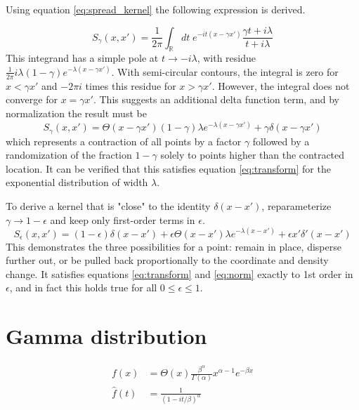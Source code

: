 \documentclass{article}
\newcommand{\intR}{\int_{\mathbb{R}}}
\begin{document}
Using equation \ref{eq:spread_kernel} the following expression is derived.

\begin{equation}
	S_\gamma (x, x') =\frac{1}{2\pi} \intR dt\;e^{-it(x - \gamma x')} \frac{\gamma t + i\lambda}{t + i\lambda}
\end{equation}
This integrand has a simple pole at $t \rightarrow -i\lambda$, with residue
$\frac{1}{2\pi} i \lambda (1-\gamma) e^{-\lambda(x - \gamma x')}$. With
semi-circular contours, the integral is zero for $x < \gamma x'$ and $-2\pi i$
times this residue for $ x > \gamma x'$. However, the integral does not
converge for $x = \gamma x'$. This suggests an additional delta function term,
and by normalization the result must be
\begin{equation}
	S_\gamma(x, x')  = \Theta(x - \gamma x') (1 - \gamma) \lambda e^{-\lambda (x - \gamma x')} + \gamma \delta(x - \gamma x')
\end{equation}
which represents a contraction of all points by a factor $\gamma$ followed by a
randomization of the fraction $1-\gamma$ solely to points higher than the
contracted location. It can be verified that this satisfies equation
\ref{eq:transform} for the exponential distribution of width $\lambda$.

To derive a kernel that is "close" to the identity $\delta(x-x')$,
reparameterize $\gamma \rightarrow 1 - \epsilon$ and keep only first-order
terms in $\epsilon$.
\begin{equation}
	S_\epsilon(x, x') = (1-\epsilon) \delta(x - x') + \epsilon \Theta(x - x') \lambda e^{-\lambda(x-x')} + \epsilon x' \delta'(x - x')
\end{equation}
This demonstrates the three possibilities for a point: remain in place,
disperse further out, or be pulled back proportionally to the coordinate and
density change. It satisfies equations \ref{eq:transform} and \ref{eq:norm}
exactly to 1st order in $\epsilon$, and in fact this holds true for all $0 \leq
	\epsilon \leq 1$.

\section{Gamma distribution}
\begin{align}
	f(x)      & = \Theta(x) \frac{\beta^{\alpha}}{\Gamma(\alpha)} x^{\alpha-1} e^{-\beta x} \\
	\hat f(t) & = \frac{1}{(1 - it/\beta)^\alpha}
\end{align}
\end{document}
